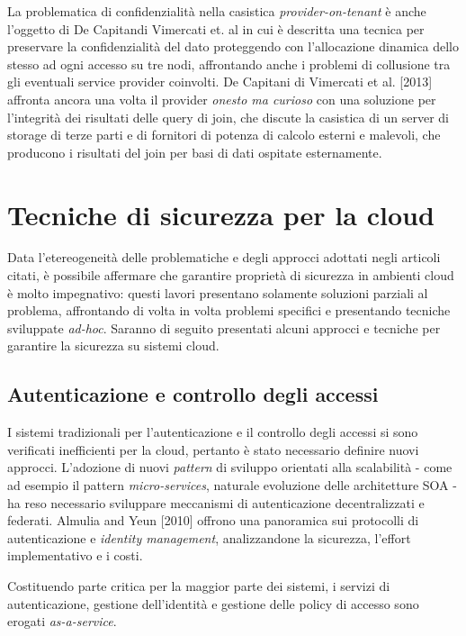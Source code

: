 \documentclass[../main.tex]{subfiles}
\begin{document}
La problematica di confidenzialità nella casistica \textit{provider-on-tenant} è anche l'oggetto di De Capitandi Vimercati  et. al
in cui è descritta una tecnica per preservare la confidenzialità del dato proteggendo con l'allocazione dinamica dello stesso ad ogni accesso su tre nodi, affrontando anche i problemi di collusione tra gli eventuali service provider coinvolti.
De Capitani di Vimercati et al. [2013] affronta ancora una volta il provider \textit{onesto ma curioso} con una soluzione per l'integrità dei risultati delle query di join, che discute la casistica di un server di storage di terze parti e di fornitori di potenza di calcolo esterni e malevoli, che producono i risultati del join per basi di dati ospitate esternamente.


\section{Tecniche di sicurezza per la cloud}
Data l'etereogeneità delle problematiche e degli approcci adottati negli articoli citati, è possibile affermare che garantire proprietà di sicurezza in ambienti cloud è molto impegnativo: questi lavori presentano solamente soluzioni parziali al problema, affrontando di volta in volta problemi specifici e presentando tecniche sviluppate \textit{ad-hoc}\cite{Ardagna:2015:SAC:2808687.2767005}.
Saranno di seguito presentati alcuni approcci e tecniche per garantire la sicurezza su sistemi cloud.

\subsection{Autenticazione e controllo degli accessi}
I sistemi tradizionali per l'autenticazione e il controllo degli accessi si sono verificati inefficienti per la cloud, pertanto è stato necessario definire nuovi approcci. L'adozione di nuovi \textit{pattern} di sviluppo orientati alla scalabilità - come ad esempio il pattern \textit{micro-services}, naturale evoluzione delle architetture SOA - ha reso necessario sviluppare meccanismi di autenticazione decentralizzati e federati.
Almulia and Yeun [2010] offrono una panoramica sui protocolli di autenticazione e \textit{identity management}, analizzandone la sicurezza, l'effort implementativo e i costi.%

Costituendo parte critica per la maggior parte dei sistemi, i servizi di autenticazione, gestione dell'identità e gestione delle policy di accesso sono erogati \textit{as-a-service}. %
\end{document}
